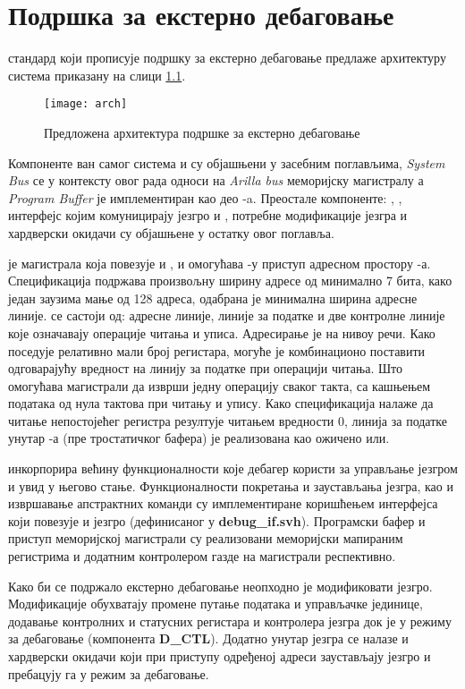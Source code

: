 \chapter{Подршка за екстерно дебаговање}

 стандард који прописује подршку за екстерно дебаговање \cite{debug_spec} предлаже архитектуру система приказану на слици \ref{fig:arch}.

\begin{figure}[h!]
	\centering
	\texttt{[image: arch]}
	\caption{Предложена архитектура подршке за екстерно дебаговање \cite{debug_spec}}
	\label{fig:arch}
\end{figure}

Компоненте ван самог система и  су објашњени у засебним поглављима, \textit{System Bus} се у контексту овог рада односи на \textit{Arilla bus} меморијску магистралу а \textit{Program Buffer} је имплементиран као део -a. Преостале компоненте: , , интерфејс којим комуницирају језгро и , потребне модификације језгра и хардверски окидачи су објашњене у остатку овог поглавља.

 је магистрала која повезује  и , и омогућава -у приступ адресном простору -а. Спецификација подржава произвољну ширину адресе од минимално 7 бита, како један  заузима мање од 128 адреса, одабрана је минимална ширина адресне линије.  се састоји од: адресне линије, линије за податке и две контролне линије које означавају операције читања и уписа. Адресирање је на нивоу речи. Како  поседује релативно мали број регистара, могуће је комбинационо поставити одговарајућу вредност на линију за податке при операцији читања. Што омогућава магистрали да изврши једну операцију сваког такта, са кашњењем података од нула тактова при читању и упису. Како спецификација налаже да читање непостојећег регистра резултује читањем вредности 0, линија за податке унутар -а (пре тростатичког бафера) је реализована као ожичено или.

 инкорпорира већину функционалности које дебагер користи за управљање језгром и увид у његово стање. Функционалности покретања и заустављања језгра, као и извршавање апстрактних команди су имплементиране коришћењем интерфејса који повезује  и језгро (дефинисаног у \textbf{debug\_if.svh}). Програмски бафер и приступ меморијској магистрали су реализовани меморијски мапираним регистрима и додатним контролером газде на магистрали респективно. 

Како би се подржало екстерно дебаговање неопходно је модификовати језгро. Модификације обухватају промене путање података и управљачке јединице, додавање контролних и статусних регистара и контролера језгра док је у режиму за дебаговање (компонента \textbf{D\_CTL}). Додатно унутар језгра се налазе и хардверски окидачи који при приступу одређеној адреси заустављају језгро и пребацују га у режим за дебаговање. 

